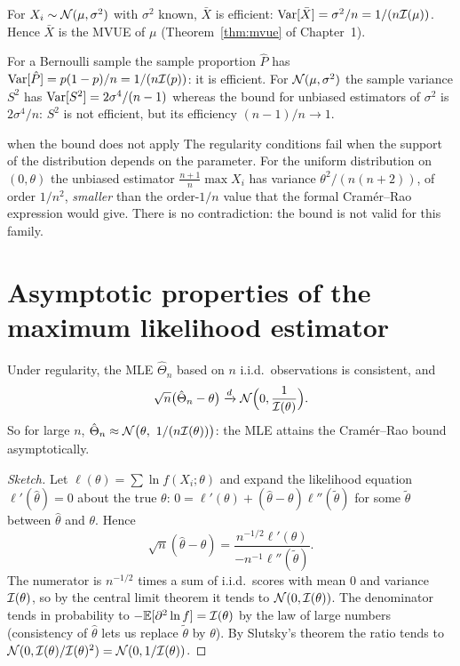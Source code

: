 \begin{theorem}\label{thm:mvue-proof}
For $X_i\sim\mathcal{N}(\mu,\sigma^2)$ with $\sigma^2$ known, $\bar{X}$ is efficient: $\operatorname{Var}[\bar{X}]=\sigma^2/n=1/(n\mathcal{I}(\mu))$. Hence $\bar{X}$ is the MVUE of $\mu$ (Theorem~\ref{thm:mvue} of Chapter~1).
\end{theorem}

\begin{example}
For a Bernoulli sample the sample proportion $\hat{P}$ has $\operatorname{Var}[\hat{P}]=p(1-p)/n=1/(n\mathcal{I}(p))$: it is efficient. For $\mathcal{N}(\mu,\sigma^2)$ the sample variance $S^2$ has $\operatorname{Var}[S^2]=2\sigma^4/(n-1)$ whereas the bound for unbiased estimators of $\sigma^2$ is $2\sigma^4/n$: $S^2$ is not efficient, but its efficiency $(n-1)/n\to1$.
\end{example}

\begin{pitfall}{when the bound does not apply}
The regularity conditions fail when the support of the distribution depends on the parameter. For the uniform distribution on $(0,\theta)$ the unbiased estimator $\frac{n+1}n\max X_i$ has variance $\theta^2/(n(n+2))$, of order $1/n^2$, \emph{smaller} than the order-$1/n$ value that the formal Cram\'er--Rao expression would give. There is no contradiction: the bound is not valid for this family.
\end{pitfall}

\section{Asymptotic properties of the maximum likelihood estimator}

\begin{theorem}\label{thm:mle-asym}
Under regularity, the MLE $\hat\Theta_n$ based on $n$ i.i.d.\ observations is consistent, and
\[ \sqrt n\big(\hat\Theta_n-\theta\big)\xrightarrow{d}\mathcal{N}\Big(0,\frac1{\mathcal{I}(\theta)}\Big). \]
So for large $n$, $\hat\Theta_n\approx\Normal\big(\theta,\ 1/(n\Fish(\theta))\big)$: the MLE attains the Cram\'er--Rao bound asymptotically.
\end{theorem}

\begin{proof}[Sketch]
Let $\ell(\theta)=\sum\ln f(X_i;\theta)$ and expand the likelihood equation $\ell'(\hat\theta)=0$ about the true $\theta$: $0=\ell'(\theta)+(\hat\theta-\theta)\ell''(\tilde\theta)$ for some $\tilde\theta$ between $\hat\theta$ and $\theta$. Hence
\[ \sqrt n(\hat\theta-\theta)=\frac{n^{-1/2}\ell'(\theta)}{-n^{-1}\ell''(\tilde\theta)}. \]
The numerator is $n^{-1/2}$ times a sum of i.i.d.\ scores with mean $0$ and variance $\mathcal{I}(\theta)$, so by the central limit theorem it tends to $\mathcal{N}(0,\mathcal{I}(\theta))$. The denominator tends in probability to $-\mathbb{E}[\partial^2\ln f]=\mathcal{I}(\theta)$ by the law of large numbers (consistency of $\hat\theta$ lets us replace $\tilde\theta$ by $\theta$). By Slutsky's theorem the ratio tends to $\mathcal{N}(0,\mathcal{I}(\theta)/\mathcal{I}(\theta)^2)=\mathcal{N}(0,1/\mathcal{I}(\theta))$.
\end{proof}

